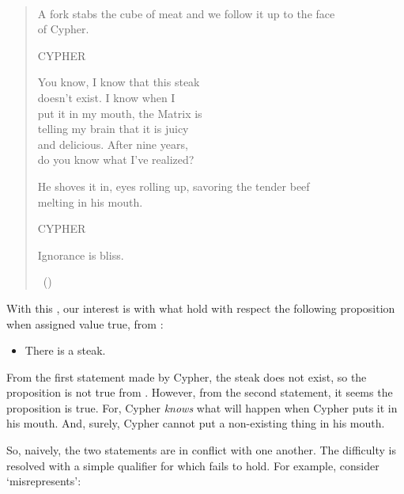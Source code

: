 \begin{note}
  \begin{scenario}
    \mbox{ }%
    \vspace{-\baselineskip}
    \begin{quote}
      {
        \ttfamily

        A fork stabs the cube of meat and we follow it up to the face \\
        of Cypher.

        \qquad\qquad CYPHER

        \qquad You know, I know that this steak \\
        \indent\qquad doesn't exist. I know when I \\
        \indent\qquad put it in my mouth, the Matrix is \\
        \indent\qquad telling my brain that it is juicy \\
        \indent\qquad and delicious. After nine years, \\
        \indent\qquad do you know what I've realized?

        He shoves it in, eyes rolling up, savoring the tender beef \\
         melting in his mouth.

        \qquad\qquad CYPHER

        \qquad Ignorance is bliss.}%
      \mbox{ }\hfill\mbox{(\citeyear[330--331]{Wachowski:2000uh})}
    \end{quote}%
    \vspace{-\baselineskip}
  \end{scenario}

  With this \scen{}, our interest is with what hold with respect the following proposition when assigned value true, from :

  \begin{itemize}
  \item
    There is a steak.
  \end{itemize}

  From the first statement made by Cypher, the steak does not exist, so the proposition is not true from .
  However, from the second statement, it seems the proposition is true.
  For, Cypher \emph{knows} what will happen when Cypher puts it in his mouth.
  And, surely, Cypher cannot put a non-existing thing in his mouth.

  So, naively, the two statements are in conflict with one another.
  The difficulty is resolved with a simple qualifier for which \ptivity{} fails to hold.
  For example, consider `misrepresents':


\end{note}
